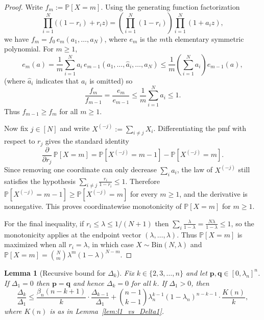 \documentclass[11pt]{amsart}
\numberwithin{equation}{section}
\newtheorem{lemma}[theorem]{Lemma}
\theoremstyle{definition}
\newcommand{\vct}[1]{\mathbf{#1}}
\newcommand{\pvec}{\vct{p}}
\newcommand{\qvec}{\vct{q}}
\newcommand{\lam}{\lambda}
\begin{document}
\begin{proof}
Write $f_m:=\mathbb{P}[X=m]$.
Using the generating function factorization
\[
\prod_{i=1}^N\big((1-r_i)+r_i z\big)
= \left(\prod_{i=1}^N(1-r_i)\right)\prod_{i=1}^N(1+a_i z),
\]
we have $f_m=f_0\,e_m(a_1,\dots,a_N)$, where $e_m$ is the $m$th elementary symmetric polynomial.
For $m\ge 1$,
\[
e_m(a)=\frac1m\sum_{i=1}^N a_i\,e_{m-1}(a_1,\dots,\widehat{a}_i,\dots,a_N)
\le \frac1m\left(\sum_{i=1}^N a_i\right)e_{m-1}(a),
\]
(where $\widehat{a}_i$ indicates that $a_i$ is omitted)
so
\[
\frac{f_m}{f_{m-1}}=\frac{e_m}{e_{m-1}}\le \frac{1}{m}\sum_{i=1}^N a_i\le 1.
\]
Thus $f_{m-1}\ge f_m$ for all $m\ge 1$.

Now fix $j\in[N]$ and write $X^{(-j)}:=\sum_{i\neq j}X_i$.
Differentiating the pmf with respect to $r_j$ gives the standard identity
\[
\frac{\partial}{\partial r_j}\,\mathbb{P}[X=m]
=\mathbb{P}[X^{(-j)}=m-1]-\mathbb{P}[X^{(-j)}=m].
\]
Since removing one coordinate can only decrease $\sum_i a_i$, the law of $X^{(-j)}$ still satisfies the hypothesis
$\sum_{i\neq j}\frac{r_i}{1-r_i}\le 1$.
Therefore $\mathbb{P}[X^{(-j)}=m-1]\ge \mathbb{P}[X^{(-j)}=m]$ for every $m\ge 1$, and the derivative is nonnegative.
This proves coordinatewise monotonicity of $\mathbb{P}[X=m]$ for $m\ge 1$.

For the final inequality, if $r_i\le \lam\le 1/(N+1)$ then
$\sum_i \frac{\lam}{1-\lam}=\frac{N\lam}{1-\lam}\le 1$, so the monotonicity applies at the endpoint vector $(\lam,\dots,\lam)$.
Thus $\mathbb{P}[X=m]$ is maximized when all $r_i=\lam$, in which case $X\sim\mathrm{Bin}(N,\lam)$ and
$\mathbb{P}[X=m]=\binom{N}{m}\lam^m(1-\lam)^{N-m}$.
\end{proof}

\begin{lemma}[Recursive bound for $\Delta_k$]\label{lem:recursive}
Fix $k\in\{2,3,\dots,n\}$ and let $\pvec,\qvec\in[0,\lam_n]^n$.
If $\Delta_1=0$ then $\pvec=\qvec$ and hence $\Delta_k=0$ for all $k$.
If $\Delta_1>0$, then
\[
\frac{\Delta_k}{\Delta_1}
\le
\frac{\beta_n(n-k+1)}{k}\cdot\frac{\Delta_{k-1}}{\Delta_1}
+
\binom{n-1}{k-1}\lam_n^{k-1}(1-\lam_n)^{n-k-1}\cdot\frac{K(n)}{k},
\]
where $K(n)$ is as in Lemma~\ref{lem:l1_vs_Delta1}.
\end{lemma}
\end{document}
